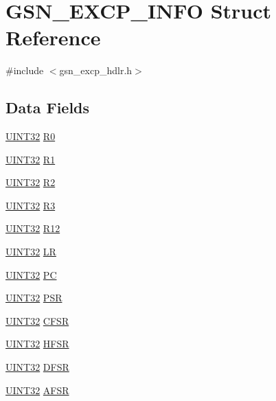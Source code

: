 \hypertarget{a00070}{
\section{GSN\_\-EXCP\_\-INFO Struct Reference}
\label{a00070}
}


{\ttfamily \#include $<$gsn\_\-excp\_\-hdlr.h$>$}

\subsection*{Data Fields}
\begin{DoxyCompactItemize}
\item 
\hyperlink{a00660_gae1e6edbbc26d6fbc71a90190d0266018}{UINT32} \hyperlink{a00070_a559e4af7b29c84dda7f3a90f70dd5e08}{R0}
\item 
\hyperlink{a00660_gae1e6edbbc26d6fbc71a90190d0266018}{UINT32} \hyperlink{a00070_ad35ad624c295f3c20828a68e7e4ee0c9}{R1}
\item 
\hyperlink{a00660_gae1e6edbbc26d6fbc71a90190d0266018}{UINT32} \hyperlink{a00070_ae2751c92a2f4b1ca5fdff5e041c977cc}{R2}
\item 
\hyperlink{a00660_gae1e6edbbc26d6fbc71a90190d0266018}{UINT32} \hyperlink{a00070_ab88a2767b8adee3d0b36b49968dd37b9}{R3}
\item 
\hyperlink{a00660_gae1e6edbbc26d6fbc71a90190d0266018}{UINT32} \hyperlink{a00070_ab4b83dd68da237a342f8c0437c2608a4}{R12}
\item 
\hyperlink{a00660_gae1e6edbbc26d6fbc71a90190d0266018}{UINT32} \hyperlink{a00070_af6054d5808462912febc35dda40a88f6}{LR}
\item 
\hyperlink{a00660_gae1e6edbbc26d6fbc71a90190d0266018}{UINT32} \hyperlink{a00070_adf3232a3532df46f7f49588de9eee0c8}{PC}
\item 
\hyperlink{a00660_gae1e6edbbc26d6fbc71a90190d0266018}{UINT32} \hyperlink{a00070_a2ee4f6874fac915777bdfe3c85df3e5c}{PSR}
\item 
\hyperlink{a00660_gae1e6edbbc26d6fbc71a90190d0266018}{UINT32} \hyperlink{a00070_a219283299e0eb2860edb9fceef157f6c}{CFSR}
\item 
\hyperlink{a00660_gae1e6edbbc26d6fbc71a90190d0266018}{UINT32} \hyperlink{a00070_a4682ccbb4f1337974d76f73d65a15e73}{HFSR}
\item 
\hyperlink{a00660_gae1e6edbbc26d6fbc71a90190d0266018}{UINT32} \hyperlink{a00070_a4537dafbf2cdc274f2b9521364cab961}{DFSR}
\item 
\hyperlink{a00660_gae1e6edbbc26d6fbc71a90190d0266018}{UINT32} \hyperlink{a00070_a3a4be2ea17237bed3ec11da27552ce96}{AFSR}

\end{DoxyCompactItemize}
